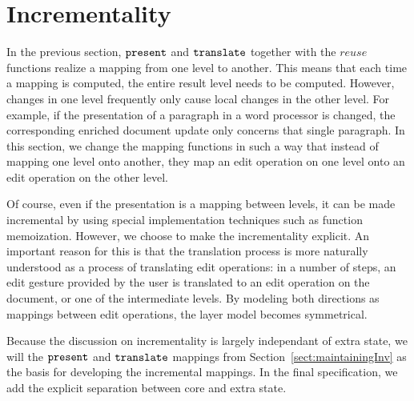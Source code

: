


%																
\section{Incrementality} \label{sect:maintainingInc}

In the previous section, ${\tt present}$ and ${\tt translate}$ together with the $reuse$ functions realize a mapping from one level to another. This means that each time a mapping is computed, the entire result level needs to be computed. However, changes in one level frequently only cause local changes in the other level. For example, if the presentation of a paragraph in a word processor is changed, the corresponding enriched document update only concerns that single paragraph. In this section, we change the mapping functions in such a way that instead of mapping one level onto another, they map an edit operation on one level onto an edit operation on the other level. 

Of course, even if the presentation is a mapping between levels, it can be made incremental by using special implementation techniques such as function memoization. However, we choose to make the incrementality explicit. An important reason for this is that the translation process is more naturally understood as a process of translating edit operations: in a number of steps, an edit gesture provided by the user is translated to an edit operation on the document, or one of the intermediate levels. By modeling both directions as mappings between edit operations, the layer model becomes symmetrical. 

Because the discussion on incrementality is largely independant of extra state, we will the ${\tt present}$ and 
${\tt translate}$ mappings from Section~\ref{sect:maintainingInv} as the basis for developing the incremental mappings. In the final specification, we add the explicit separation between core and extra state.


%																
